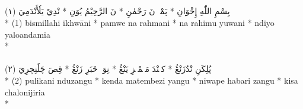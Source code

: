 \documentclass[a4paper, 12pt]{report}
\begin{document}
\begin{center}
 \\
 \\
 \\
[5mm]
\\
\end{center}




\begin{center} 

\textarabic{(١) \textcolor{mygreen}{بِسْمِ اللّٰهِ إِخْوَانِ  * پَمْوٖ نَ رَحْمٰنِ  * نَ الرَّحِيْمُ يُوَنِ  * نْدِيٗ يَلٗأَنْدَمِيَ }} \\* 
(1) bismillahi  ikhwāni  * pamwe na rahmani  * na rahimu yuwani  * ndiyo yaloandamia  \\* 
 \\ 
\\[8mm] 

\textarabic{(٢) \textcolor{mygreen}{پُلِكَنِ نْدُزَنْڠُ  * كهٖنْدَ مَتٖمْبٖزِ يَنْڠُ  * نِوَپٖ خَبَرِ زَنْڠُ  * قِصَ چَلٗنِجِرِيَ }} \\* 
(2) pulikani nduzangu  * kenda matembezi yangu  * niwape habari zangu  * kisa chalonijiria  \\* 
 \\ 
\\[8mm] 


\end{center}
\end{document}
